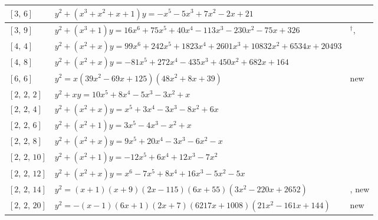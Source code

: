 \documentclass[11pt]{amsart}
\begin{document}
\begin{longtable}{|>{\raggedright\arraybackslash}p{1.7cm}|>{\raggedright\arraybackslash}p{}|>{\raggedright\arraybackslash}p{2.1cm}|}
$[3,\,6]$ & \href{https://alpha.lmfdb.org/Genus2Curve/Q/?jump=[[21,-2,7,-5,0,-1],[1,1,1,1]]}{$y^2 + (x^{3}+x^{2}+x+1)y = -x^{5}-5x^{3}+7x^{2}-2x+21$} & \cite{BookerSutherland}\\ \hline
$[3,\,9]$ & \href{https://alpha.lmfdb.org/Genus2Curve/Q/?jump=[[326,-75,-230,-113,40,75,16],[1,0,0,1]]}{$y^2 + (x^{3}+1)y = 16x^{6}+75x^{5}+40x^{4}-113x^{3}-230x^{2}-75x+326$} & \cite{Leprevost1995}$^\dagger$, \cite{BookerSutherland}\\ \hline
$[4,\,4]$ & \href{https://alpha.lmfdb.org/Genus2Curve/Q/?jump=[[20493,6534,10832,2601,1823,242,99],[0,1,1]]}{$y^2 + (x^{2}+x)y = 99x^{6}+242x^{5}+1823x^{4}+2601x^{3}+10832x^{2}+6534x+20493$} & \cite{BookerSutherland}\\ \hline
$[4,\,8]$ & \href{https://alpha.lmfdb.org/Genus2Curve/Q/?jump=[[164,682,450,-435,272,-81],[0,1,1]]}{$y^2 + (x^{2}+x)y = -81x^{5}+272x^{4}-435x^{3}+450x^{2}+682x+164$} & \cite{BookerSutherland}\\ \hline
$[6,\,6]$ & $y^2 = x(39x^2-69x+125)(48x^2+8x+39)$ & new\\ \hline
$[2,\,2,\,2]$ & \href{https://www.lmfdb.org/Genus2Curve/Q/2600/a/338000/1}{$y^2 + xy = 10x^{5}+8x^{4}-5x^{3}-3x^{2}+x$} & \cite{BSSVY}\\ \hline
$[2,\,2,\,4]$ & \href{https://www.lmfdb.org/Genus2Curve/Q/3978/a/930852/1}{$y^2 + (x^{2}+x)y = x^{5}+3x^{4}-3x^{3}-8x^{2}+6x$} & \cite{BSSVY}\\ \hline
$[2,\,2,\,6]$ & \href{https://www.lmfdb.org/Genus2Curve/Q/816/a/39168/1}{$y^2 + (x^{2}+1)y = 3x^{5}-4x^{3}-x^{2}+x$} & \cite{BSSVY}\\ \hline
$[2,\,2,\,8]$ & \href{https://alpha.lmfdb.org/Genus2Curve/Q/?jump=[[0,-1,-6,-3,20,9],[0,1,1]]}{$y^2 + (x^{2}+x)y = 9x^{5}+20x^{4}-3x^{3}-6x^{2}-x$} & \cite{BookerSutherland}\\ \hline
$[2,\,2,\,10]$ & \href{https://alpha.lmfdb.org/Genus2Curve/Q/?jump=[[0,0,-7,12,6,-12],[1,0,1]]}{$y^2 + (x^{2}+1)y = -12x^{5}+6x^{4}+12x^{3}-7x^{2}$} & \cite{BookerSutherland}\\ \hline
$[2,\,2,\,12]$ & \href{https://alpha.lmfdb.org/Genus2Curve/Q/?jump=[[0,-5,-5,16,8,-7,1],[0,1,1]]}{$y^2 + (x^{2}+x)y = x^{6}-7x^{5}+8x^{4}+16x^{3}-5x^{2}-5x$} & \cite{BookerSutherland}\\ \hline
$[2,\,2,\,14]$ & $y^2 = (x+1)(x+9)(2x-115)(6x+55)(3x^2-220x+2652)$ & \cite{BookerSutherland}, new\\ \hline
$[2,\,2,\,20]$ & $y^2 = -(x-1)(6x+1)(2x+7)(6217x+1008)(21x^2-161x+144)$ & new\\ \hline

\end{longtable}
\end{document}
